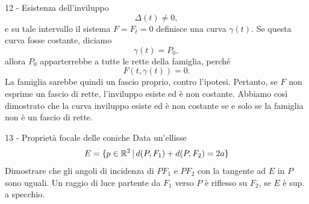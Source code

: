 \documentclass[a4paper]{article}
\begin{document}
\begin{snippetsolution}{12 - Esistenza dell'inviluppo}
    \[
        \Delta(t)\neq0,
    \]
    e su tale intervallo il sistema \(F=F_t=0\) definisce una curva \(\gamma(t)\). Se questa curva fosse costante, diciamo
    \[
        \gamma(t)=P_0,
    \]
    allora \(P_0\) apparterrebbe a tutte le rette della famiglia, perché
    \[
        F(t,\gamma(t))=0.
    \]
    La famiglia sarebbe quindi un fascio proprio, contro l'ipotesi.
    Pertanto, se \(F\) non esprime un fascio di rette, l'inviluppo esiste ed è non costante. Abbiamo così dimostrato che la curva inviluppo esiste ed è non costante se e solo se la famiglia non è un fascio di rette.
\end{snippetsolution}

\begin{snippetexercise}{13 - Proprietà focale delle coniche}
    Data un'ellisse \[
        E = \{ p \in \mathbb{R}^2 \,|\, d(P, F_1) + d(P, F_2) = 2a \}
    \]
    Dimostrare che gli angoli di incidenza di \(PF_1\) e \(PF_2\)
    con la tangente ad \(E\) in \(P\) sono uguali.
    Un raggio di luce partente da \(F_1\) verso \(P\)
    è riflesso su \(F_2\), se \(E\) è sup. a specchio.
\end{snippetexercise}
\end{document}
